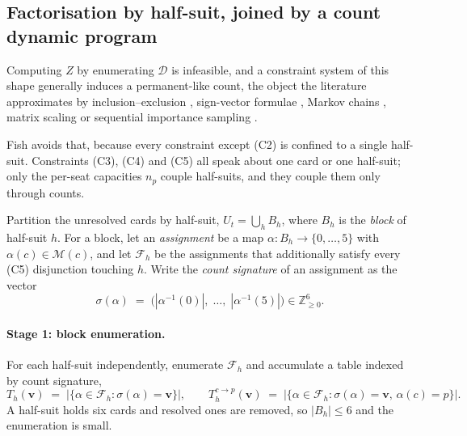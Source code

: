 \subsection{Factorisation by half-suit, joined by a count dynamic program}
\label{sec:inference-factor}

Computing $Z$ by enumerating $\mathcal{D}$ is infeasible, and a constraint system of this shape
generally induces a permanent-like count, the object the literature approximates by
inclusion--exclusion \cite{ryser}, sign-vector formulae \cite{glynn}, Markov chains \cite{jsv},
matrix scaling \cite{lsw} or sequential importance sampling \cite{chen-sis}.

Fish avoids that, because every constraint except (C2) is confined to a single half-suit. Constraints
(C3), (C4) and (C5) all speak about one card or one half-suit; only the per-seat capacities $n_p$
couple half-suits, and they couple them only through counts.

Partition the unresolved cards by half-suit, $U_t = \bigcup_{h} B_h$, where $B_h$ is the
\emph{block} of half-suit $h$. For a block, let an \emph{assignment} be a map $\alpha: B_h \to
\{0,\dots,5\}$ with $\alpha(c) \in \mathcal{M}(c)$, and let $\mathcal{F}_h$ be the assignments that
additionally satisfy every (C5) disjunction touching $h$. Write the \emph{count signature} of an
assignment as the vector
\[
  \sigma(\alpha) \;=\; \bigl(|\alpha^{-1}(0)|,\;\dots,\;|\alpha^{-1}(5)|\bigr) \in \mathbb{Z}_{\ge 0}^{6}.
\]

\paragraph{Stage 1: block enumeration.} For each half-suit independently, enumerate $\mathcal{F}_h$
and accumulate a table indexed by count signature,
\begin{equation}
  T_h(\mathbf{v}) \;=\; \bigl|\{\alpha \in \mathcal{F}_h : \sigma(\alpha) = \mathbf{v}\}\bigr|,
  \qquad
  T_h^{c \to p}(\mathbf{v}) \;=\; \bigl|\{\alpha \in \mathcal{F}_h : \sigma(\alpha) = \mathbf{v},\,
  \alpha(c) = p\}\bigr|.
  \label{eq:blocktable}
\end{equation}
A half-suit holds six cards and resolved ones are removed, so $|B_h| \le 6$ and the enumeration is
small.

